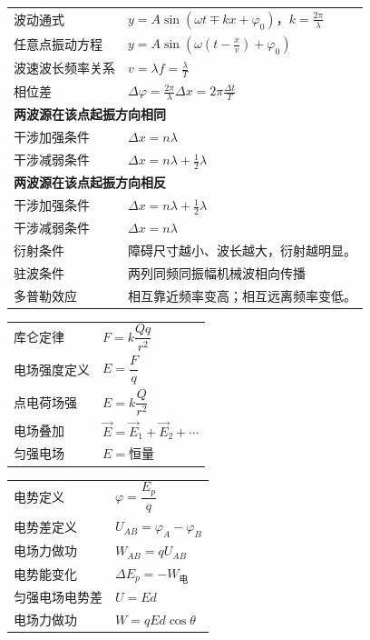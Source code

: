 \begin{tabularx}{\columnwidth}{XX}
  波动通式 & $y=A\sin(\omega t\mp kx+\varphi_0)$，$k=\frac{2\pi}{\lambda}$ \\
  任意点振动方程 & $y=A\sin(\omega (t-\frac{x}{v})+\varphi_0)$ \\
  波速波长频率关系 & $v=\lambda f=\frac{\lambda}{T}$ \\
  相位差 & $\Delta\varphi=\frac{2\pi}{\lambda}\Delta x=2\pi\frac{\Delta t}{T}$ \\
  \multicolumn{2}{l}{\textbf{两波源在该点起振方向相同}} \\
  干涉加强条件 & $\Delta x=n\lambda$ \\
  干涉减弱条件 & $\Delta x=n\lambda+\frac12\lambda$ \\
  \multicolumn{2}{l}{\textbf{两波源在该点起振方向相反}} \\
  干涉加强条件 & $\Delta x=n\lambda+\frac12\lambda$ \\
  干涉减弱条件 & $\Delta x=n\lambda$ \\
  衍射条件 & 障碍尺寸越小、波长越大，衍射越明显。 \\
  驻波条件 & 两列同频同振幅机械波相向传播 \\
  多普勒效应 & 相互靠近频率变高；相互远离频率变低。 \\
\end{tabularx}
\medskip

\begin{tabularx}{\columnwidth}{XX}
  库仑定律 & $F=k\dfrac{Qq}{r^2}$ \\
  电场强度定义 & $E=\dfrac{F}{q}$ \\
  点电荷场强 & $E=k\dfrac{Q}{r^2}$ \\
  电场叠加 & $\vec E=\vec E_1+\vec E_2+\cdots$ \\
  匀强电场 & $E=\text{恒量}$ \\
\end{tabularx}
\medskip

\begin{tabularx}{\columnwidth}{XX}
  电势定义 & $\varphi=\dfrac{E_p}{q}$ \\
  电势差定义 & $U_{AB}=\varphi_A-\varphi_B$ \\
  电场力做功 & $W_{AB}=qU_{AB}$ \\
  电势能变化 & $\Delta E_p=-W_{\text{电}}$ \\
  匀强电场电势差 & $U=Ed$ \\
  电场力做功 & $W=qEd\cos\theta$ \\
\end{tabularx}
\medskip

